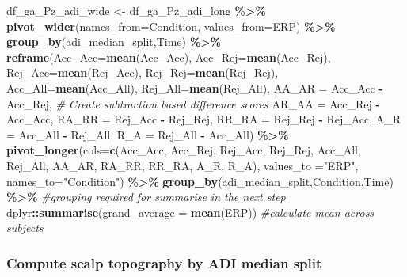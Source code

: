 \documentclass[
]{article}
\newenvironment{Shaded}{\begin{snugshade}}{\end{snugshade}}
\newcommand{\AttributeTok}[1]{\textcolor[rgb]{0.13,0.29,0.53}{#1}}
\newcommand{\CommentTok}[1]{\textcolor[rgb]{0.56,0.35,0.01}{\textit{#1}}}
\newcommand{\FunctionTok}[1]{\textcolor[rgb]{0.13,0.29,0.53}{\textbf{#1}}}
\newcommand{\NormalTok}[1]{#1}
\newcommand{\OtherTok}[1]{\textcolor[rgb]{0.56,0.35,0.01}{#1}}
\newcommand{\SpecialCharTok}[1]{\textcolor[rgb]{0.81,0.36,0.00}{\textbf{#1}}}
\newcommand{\StringTok}[1]{\textcolor[rgb]{0.31,0.60,0.02}{#1}}
\begin{document}
\begin{Shaded}
\begin{Highlighting}[]
\NormalTok{df\_ga\_Pz\_adi\_wide }\OtherTok{\textless{}{-}}\NormalTok{ df\_ga\_Pz\_adi\_long }\SpecialCharTok{\%\textgreater{}\%}
  \FunctionTok{pivot\_wider}\NormalTok{(}\AttributeTok{names\_from=}\NormalTok{Condition, }\AttributeTok{values\_from=}\NormalTok{ERP) }\SpecialCharTok{\%\textgreater{}\%}
  \FunctionTok{group\_by}\NormalTok{(adi\_median\_split,Time) }\SpecialCharTok{\%\textgreater{}\%}
  \FunctionTok{reframe}\NormalTok{(}\AttributeTok{Acc\_Acc=}\FunctionTok{mean}\NormalTok{(Acc\_Acc),}
          \AttributeTok{Acc\_Rej=}\FunctionTok{mean}\NormalTok{(Acc\_Rej),}
          \AttributeTok{Rej\_Acc=}\FunctionTok{mean}\NormalTok{(Rej\_Acc),}
          \AttributeTok{Rej\_Rej=}\FunctionTok{mean}\NormalTok{(Rej\_Rej),}
          \AttributeTok{Acc\_All=}\FunctionTok{mean}\NormalTok{(Acc\_All),}
          \AttributeTok{Rej\_All=}\FunctionTok{mean}\NormalTok{(Rej\_All),}
         \AttributeTok{AA\_AR =}\NormalTok{ Acc\_Acc }\SpecialCharTok{{-}}\NormalTok{ Acc\_Rej, }\CommentTok{\# Create subtraction based difference scores}
         \AttributeTok{AR\_AA =}\NormalTok{ Acc\_Rej }\SpecialCharTok{{-}}\NormalTok{ Acc\_Acc,}
         \AttributeTok{RA\_RR =}\NormalTok{ Rej\_Acc }\SpecialCharTok{{-}}\NormalTok{ Rej\_Rej,}
         \AttributeTok{RR\_RA =}\NormalTok{ Rej\_Rej }\SpecialCharTok{{-}}\NormalTok{ Rej\_Acc,}
         \AttributeTok{A\_R =}\NormalTok{ Acc\_All }\SpecialCharTok{{-}}\NormalTok{ Rej\_All,}
         \AttributeTok{R\_A =}\NormalTok{ Rej\_All }\SpecialCharTok{{-}}\NormalTok{ Acc\_All) }\SpecialCharTok{\%\textgreater{}\%}
  \FunctionTok{pivot\_longer}\NormalTok{(}\AttributeTok{cols=}\FunctionTok{c}\NormalTok{(Acc\_Acc, Acc\_Rej, Rej\_Acc, Rej\_Rej, Acc\_All, Rej\_All, }
\NormalTok{                      AA\_AR, RA\_RR, RR\_RA, A\_R, R\_A), }\AttributeTok{values\_to =}\StringTok{"ERP"}\NormalTok{, }\AttributeTok{names\_to=}\StringTok{"Condition"}\NormalTok{) }\SpecialCharTok{\%\textgreater{}\%}
  \FunctionTok{group\_by}\NormalTok{(adi\_median\_split,Condition,Time) }\SpecialCharTok{\%\textgreater{}\%} \CommentTok{\#grouping required for summarise in the next step}
\NormalTok{  dplyr}\SpecialCharTok{::}\FunctionTok{summarise}\NormalTok{(}\AttributeTok{grand\_average =} \FunctionTok{mean}\NormalTok{(ERP)) }\CommentTok{\#calculate mean across subjects}
\end{Highlighting}
\end{Shaded}

\hypertarget{compute-scalp-topography-by-adi-median-split}{%
\subsubsection{Compute scalp topography by ADI median
split}\label{compute-scalp-topography-by-adi-median-split}}
\end{document}
